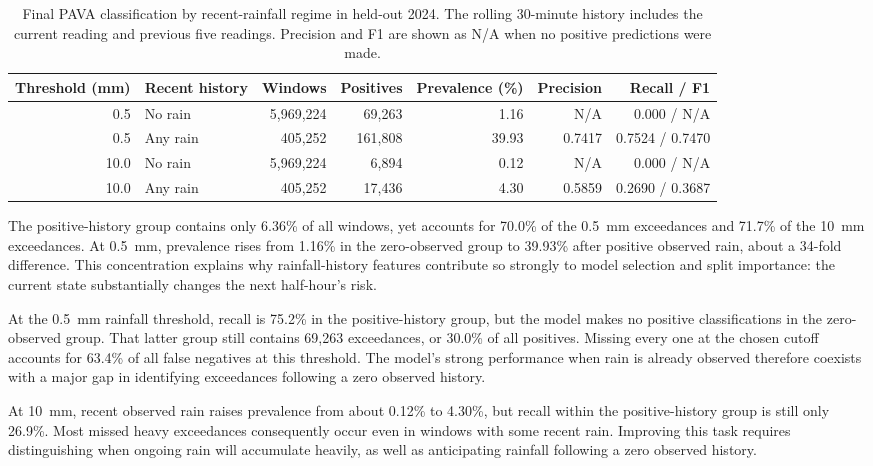 \documentclass[11pt,a4paper]{article}
\begin{document}
\begin{table}[htbp]
\centering\scriptsize
\caption{Final PAVA classification by recent-rainfall regime in held-out
2024. The rolling 30-minute history includes the current reading and previous
five readings. Precision and F1 are shown as N/A when no positive predictions
were made.}
\label{tab:onset}
\begin{tabular}{r l r r r r r}
\toprule
Threshold (mm) & Recent history & Windows & Positives & Prevalence (\%) &
Precision & Recall / F1 \\
\midrule
0.5 & No rain & 5,969,224 & 69,263 & 1.16 & N/A & 0.000 / N/A \\
0.5 & Any rain & 405,252 & 161,808 & 39.93 & 0.7417 & 0.7524 / 0.7470 \\
10.0 & No rain & 5,969,224 & 6,894 & 0.12 & N/A & 0.000 / N/A \\
10.0 & Any rain & 405,252 & 17,436 & 4.30 & 0.5859 & 0.2690 / 0.3687 \\
\bottomrule
\end{tabular}
\end{table}

The positive-history group contains only 6.36\% of all
windows, yet accounts for 70.0\% of the 0.5~mm exceedances and 71.7\% of the
10~mm exceedances. At 0.5~mm, prevalence rises from 1.16\% in the
zero-observed group to 39.93\% after positive observed rain, about a
34-fold difference. This concentration explains why rainfall-history
features contribute so strongly to model selection and split importance:
the current state substantially changes the next half-hour's risk.

At the 0.5~mm rainfall threshold, recall is 75.2\% in the positive-history group,
but the model makes no positive classifications in the zero-observed group.
That latter group still contains 69,263 exceedances, or 30.0\% of all
positives. Missing every one at the chosen cutoff accounts for 63.4\% of
all false negatives at this threshold. The model's strong performance when
rain is already observed therefore coexists with a major gap in identifying
exceedances following a zero observed history.

At 10~mm, recent observed rain raises prevalence from about 0.12\% to
4.30\%, but recall within the positive-history group is still only 26.9\%.
Most missed heavy exceedances consequently occur even in windows with some
recent rain. Improving this task requires distinguishing when ongoing
rain will accumulate heavily, as well as anticipating rainfall following
a zero observed history.
\end{document}
